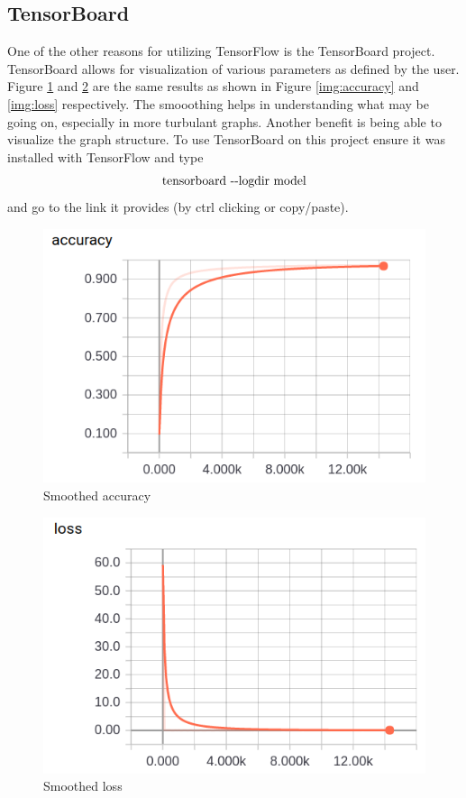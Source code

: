 \documentclass{article}
\begin{document}
\subsection{TensorBoard}\label{sec:tensorboard}
    One of the other reasons for utilizing TensorFlow is the TensorBoard 
    project. TensorBoard allows for visualization of various parameters as 
    defined by the user. Figure \ref{img:acc_smooth} and \ref{img:loss_smooth} 
    are the same results as shown in Figure \ref{img:accuracy} and 
    \ref{img:loss} respectively. The smooothing helps in understanding what may 
    be going on, especially in more turbulant graphs. Another benefit is being 
    able to visualize the graph structure. To use TensorBoard on this project 
    ensure it was installed with TensorFlow and type 
    \[\textnormal{tensorboard\ -\--logdir\ model}\]
    and go to the link it provides (by ctrl clicking or copy/paste). 
    \begin{figure}[H]  
    \begin{center}
    \includegraphics[scale=0.65]{images/acc}
    \caption{Smoothed accuracy}\label{img:acc_smooth}
    \end{center}
    \end{figure}
    \begin{figure}[H]  
    \begin{center}
    \includegraphics[scale=0.65]{images/loss}
    \caption{Smoothed loss}\label{img:loss_smooth}
    \end{center}
    \end{figure}
\newpage
\end{document}
